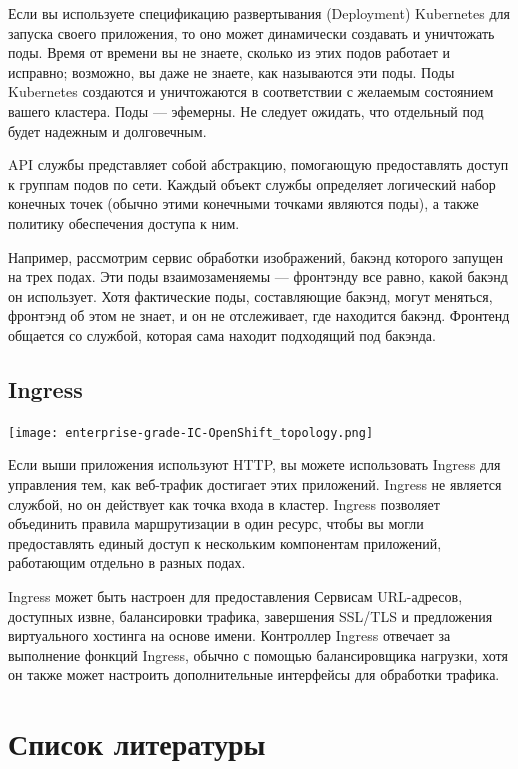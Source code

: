 \documentclass[a4page]{article}
\begin{document}
Если вы используете спецификацию развертывания (Deployment) Kubernetes для запуска своего приложения, то оно может динамически создавать и уничтожать поды. Время от времени вы не знаете, сколько из этих подов работает и исправно; возможно, вы даже не знаете, как называются эти поды. Поды Kubernetes создаются и уничтожаются в соответствии с желаемым состоянием вашего кластера. Поды --- эфемерны. Не следует ожидать, что отдельный под будет надежным и долговечным.

API службы представляет собой абстракцию, помогающую предоставлять доступ к группам подов по сети. Каждый объект службы определяет логический набор конечных точек (обычно этими конечными точками являются поды), а также политику обеспечения доступа к ним.

Например, рассмотрим сервис обработки изображений, бакэнд которого запущен на трех подах. Эти поды взаимозаменяемы --- фронтэнду все равно, какой бакэнд он использует. Хотя фактические поды, составляющие бакэнд, могут меняться, фронтэнд об этом не знает, и он не отслеживает, где находится бакэнд. Фронтенд общается со службой, которая сама находит подходящий под бакэнда.

\subsection{Ingress}
\texttt{[image: enterprise-grade-IC-OpenShift\_topology.png]}

Если выши приложения используют HTTP, вы можете использовать Ingress для управления тем, как веб-трафик достигает этих приложений. Ingress не является службой, но он действует как точка входа в кластер. Ingress позволяет объединить правила маршрутизации в один ресурс, чтобы вы могли предоставлять единый доступ к нескольким компонентам приложений, работающим отдельно в разных подах.

Ingress может быть настроен для предоставления Сервисам URL-адресов, \\доступных извне, балансировки трафика, завершения SSL/TLS и предложения виртуального хостинга на основе имени\cite{k8s:ingress}. Контроллер Ingress отвечает за выполнение фонкций Ingress, обычно с помощью балансировщика нагрузки, хотя он также может настроить дополнительные интерфейсы для обработки трафика.

\newpage

\section{Список литературы}

\printbibliography [heading=none]
\end{document}
